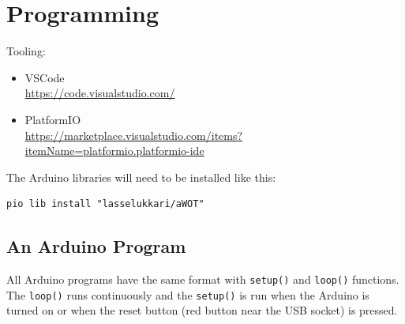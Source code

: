 \documentclass[a4paper, 11pt]{article}
\begin{document}
\section{Programming}

Tooling: 

\begin{itemize}
  \item VSCode \\
  \url{https://code.visualstudio.com/}
  \item PlatformIO \\
  \url{https://marketplace.visualstudio.com/items?itemName=platformio.platformio-ide}
\end{itemize}

The Arduino libraries will need to be installed like this:

\begin{verbatim}
pio lib install "lasselukkari/aWOT"
\end{verbatim}

\subsection{An Arduino Program}

All Arduino programs have the same format with \verb|setup()| and \verb|loop()| functions.
The \verb|loop()| runs continuously and the \verb|setup()| is run
when the Arduino is turned on
or
when the reset button (red button near the USB socket) is pressed.
\end{document}
